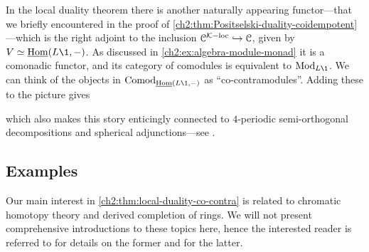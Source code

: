 \begin{remark}
    In the local duality theorem there is another naturally appearing functor---that we briefly encountered in the proof of \cref{ch2:thm:Positselski-duality-coidempotent}---which is the right adjoint to the inclusion $\EuScript{C}^{\mathcal{K}-\mathrm{loc}}\hookrightarrow \EuScript{C}$, given by $V \simeq \iHom(L\1, -)$. As discussed in \cref{ch2:ex:algebra-module-monad} it is a comonadic functor, and its category of comodules is equivalent to $\Mod_{L\1}$. We can think of the objects in $\Comod_{\iHom(L\1,-)}$ as ``co-contramodules''. Adding these to the picture gives 
    \begin{center}
    \end{center}
    which also makes this story enticingly connected to $4$-periodic semi-orthogonal decompositions and spherical adjunctions---see \cite[Section 2.5]{dyckerhoff-kaparanov-schechtman-soibelman_2024}. 
\end{remark}



\subsection{Examples}

Our main interest in \cref{ch2:thm:local-duality-co-contra} is related to chromatic homotopy theory and derived completion of rings. We will not present comprehensive introductions to these topics here, hence the interested reader is referred to \cite{barthel-beaudry_19} for details on the former and \cite{barthel-heard-valenzuela_2020} for the latter.

